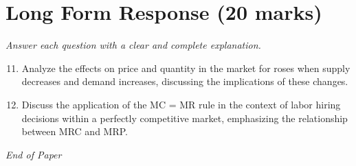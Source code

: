 \documentclass[12pt]{article}
\begin{document}
\section*{Long Form Response (20 marks)}
\textit{Answer each question with a clear and complete explanation.}
\begin{enumerate}[label=\arabic*.]
\setcounter{enumi}{10}
\item Analyze the effects on price and quantity in the market for roses when supply decreases and demand increases, discussing the implications of these changes.
\item Discuss the application of the MC = MR rule in the context of labor hiring decisions within a perfectly competitive market, emphasizing the relationship between MRC and MRP.
\end{enumerate}

\vfill
\noindent\textit{End of Paper}
\end{document}
